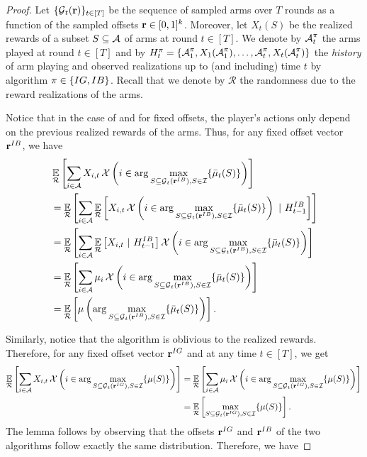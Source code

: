 \restateRegretCoupling*
\begin{proof}
Let $\{\G_t(\off)\}_{t \in [T]}$ be the sequence of sampled arms over $T$ rounds as a function of the sampled offsets $\off \in [0,1]^k$. Moreover, let $X_t(S)$ be the realized rewards of a subset $S \subseteq \A$ of arms at round $t \in [T]$. We denote by $\A^{\pi}_t$ the arms played at round $t\in[T]$ and by $H^{\pi}_t = \{\A^{\pi}_1, X_1(\A^{\pi}_1), \dots, \A^{\pi}_t, X_t(\A^{\pi}_t)\}$ the {\em history} of arm playing and observed realizations up to (and including) time $t$ by algorithm $\pi \in \{\IG, \UCB\}$. Recall that we denote by $\mathcal{R}$ the randomness due to the reward realizations of the arms.

Notice that in the case of \UCB and for fixed offsets, the player's actions only depend on the previous realized rewards of the arms. Thus, for any fixed offset vector $\off^{\UCB}$, we have
\begin{align*}
&\Ex{\mathcal{R}}{\sum_{i \in \A} X_{i,t} \event{i \in \arg\max_{S \subseteq \G_t(\off^{\UCB}), S \in \I}\{\bar{\mu}_t(S)\}} }\\
    &= \Ex{\mathcal{R}}{\sum_{i \in \A} \Ex{\mathcal{R}}{ X_{i,t} \event{i \in \arg\max_{S \subseteq \G_t(\off^{\UCB}), S \in \I}\{\bar{\mu}_t(S)\}}~|~H^{\UCB}_{t-1}}}\\
    &= \Ex{\mathcal{R}}{\sum_{i \in \A} \Ex{\mathcal{R}}{ X_{i,t}~|~H^{\UCB}_{t-1}} \event{i \in \arg\max_{S \subseteq \G_t(\off^{\UCB}), S \in \I}\{\bar{\mu}_t(S)\}}} \\
    &= \Ex{\mathcal{R}}{\sum_{i \in \A} \mu_i \event{i \in \arg\max_{S \subseteq \G_t(\off^{\UCB}), S \in \I}\{\bar{\mu}_t(S)\}}}\\
    &=\Ex{\mathcal{R}}{ \mu\left( \arg\max_{S \subseteq \G_t(\off^{\UCB}), S \in \I}\{\bar{\mu}_t(S)\}\right)}.
\end{align*}

Similarly, notice that the algorithm \IG is oblivious to the realized rewards. Therefore, for any fixed offset vector $\off^{\IG}$ and at any time $t \in [T]$, we get
\begin{align*}
    \Ex{\mathcal{R}}{\sum_{i \in \A} X_{i,t} \event{i \in \arg\max_{S \subseteq \G_t(\off^{\IG}), S \in \I}\{{\mu}(S)\}} }
    &= 
    \Ex{\mathcal{R}}{\sum_{i \in \A} \mu_i \event{i \in \arg\max_{S \subseteq \G_t(\off^{\IG}), S \in \I}\{\mu(S)\}}}\\
    &=\Ex{\mathcal{R}}{ \max_{S \subseteq \G_t(\off^{\IG}), S \in \I}\{\mu(S)\}}.
\end{align*}
The lemma follows by observing that the offsets $\off^{\IG}$ and $\off^{\UCB}$ of the two algorithms follow exactly the same distribution. Therefore, we have


\end{proof}
